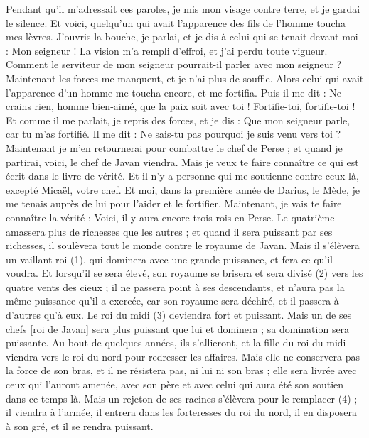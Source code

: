 \begin{multicols}{2}
Pendant qu’il m’adressait ces paroles, je mis mon visage contre terre, et je gardai le silence.
Et voici, quelqu'un qui avait l’apparence des fils de l’homme toucha mes lèvres.  J’ouvris la bouche, je parlai, et je dis à celui qui se tenait devant moi : Mon seigneur ! La vision m’a rempli d’effroi, et j’ai perdu toute vigueur.
Comment le serviteur de mon seigneur pourrait-il parler avec mon seigneur ? Maintenant les forces me manquent, et je n’ai plus de souffle.
Alors celui qui avait l’apparence d’un homme me toucha encore, et me fortifia.
Puis il me dit : Ne crains rien, homme bien-aimé, que la paix soit avec toi ! Fortifie-toi, fortifie-toi ! Et comme il me parlait, je repris des forces, et je dis : Que mon seigneur parle, car tu m'as fortifié.
Il me dit : Ne sais-tu pas pourquoi je suis venu vers toi ? Maintenant je m'en retournerai pour combattre le chef de Perse ; et quand je partirai, voici, le chef de Javan viendra.
Mais je veux te faire connaître ce qui est écrit dans le livre de vérité. Et il n'y a personne qui me soutienne contre ceux-là, excepté Micaël, votre chef.
\VerseOne{}Et moi, dans la première année de Darius, le Mède, je me tenais auprès de lui pour l’aider et le fortifier.
Maintenant, je vais te faire connaître la vérité : Voici, il y aura encore trois rois en Perse. Le quatrième amassera plus de richesses que les autres ; et quand il sera puissant par ses richesses, il soulèvera tout le monde contre le royaume de Javan.
Mais il s’élèvera un vaillant roi (1), qui dominera avec une grande puissance, et fera ce qu’il voudra.
Et lorsqu’il se sera élevé, son royaume se brisera et sera  divisé (2) vers les quatre vents des cieux ; il ne passera point à ses descendants, et n’aura pas la même puissance qu’il a exercée, car son royaume sera déchiré, et il passera à d'autres qu’à eux.
Le roi du midi (3) deviendra fort et puissant.  Mais un de ses chefs [roi de Javan] sera plus puissant que lui et dominera ; sa domination sera puissante.
Au bout de quelques années, ils s'allieront, et la fille du roi du midi viendra vers le roi du nord pour redresser les affaires. Mais elle ne conservera pas la force de son bras, et il ne résistera pas, ni lui ni son bras ; elle sera livrée avec ceux qui l’auront amenée, avec son père et avec celui qui aura été son soutien dans ce temps-là.
Mais un rejeton de ses racines s’élèvera pour le remplacer (4) ; il viendra à l’armée, il entrera dans les forteresses du roi du nord, il en disposera à son gré, et il se rendra puissant.

\end{multicols}
